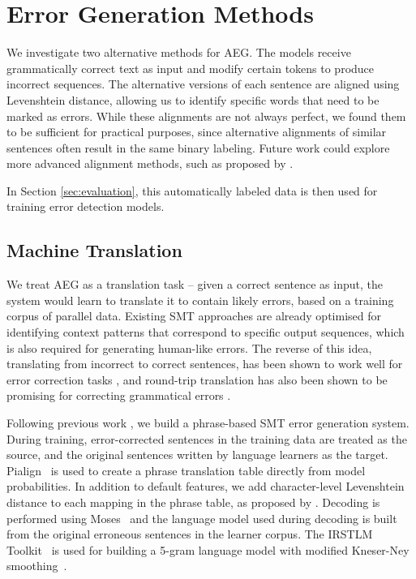 \documentclass[11pt,letterpaper]{article}
\begin{document}
\hspace{2cm}


\section{Error Generation Methods}
\label{sec:methods}

We investigate two alternative methods for AEG. The models receive grammatically correct text as input and modify certain tokens to produce incorrect sequences. The alternative versions of each sentence are aligned using Levenshtein distance, allowing us to identify specific words that need to be marked as errors. While these alignments are not always perfect, we found them to be sufficient for practical purposes, since alternative alignments of similar sentences often result in the same binary labeling.
Future work could explore more advanced alignment methods, such as proposed by .

In Section \ref{sec:evaluation}, this automatically labeled data is then used for training error detection models.


\subsection{Machine Translation}

We treat AEG as a translation task -- given a correct sentence as input, the system would learn to translate it to contain likely errors, based on a training corpus of parallel data.
Existing SMT approaches are already optimised for identifying context patterns that correspond to specific output sequences, which is also required for generating human-like errors.
The reverse of this idea, translating from incorrect to correct sentences, has been shown to work well for error correction tasks \cite{Brockett2006,Ng2013a}, and round-trip translation has also been shown to be promising for correcting grammatical errors \cite{madnani-tetreault-chodorow}.

Following previous work \cite{Brockett2006,Yuan-Felice:2013}, we build a phrase-based SMT error generation system. 
During training, error-corrected sentences in the training data are treated as the source, and the original sentences written by language learners as the target. Pialign~\cite{Pialign} is used to create a phrase translation table directly from model probabilities. 
In addition to default features, we add character-level Levenshtein distance to each mapping in the phrase table, as proposed by . 
Decoding is performed using Moses~\cite{Moses} and the language model used during decoding is built from the original erroneous sentences in the learner corpus. 
The IRSTLM Toolkit~\cite{IRSTLM} is used for building a 5-gram language model with modified Kneser-Ney smoothing~\cite{Kneser1995}. 
\end{document}
